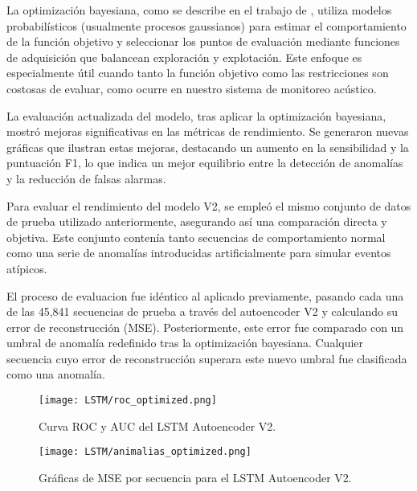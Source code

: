       La optimización bayesiana, como se describe en el trabajo de \citeauthor{gardner2014bayesian} \citeyear{gardner2014bayesian}, utiliza modelos probabilísticos (usualmente procesos gaussianos) para estimar el comportamiento de la función objetivo y seleccionar los puntos de evaluación mediante funciones de adquisición que balancean exploración y explotación. Este enfoque es especialmente útil cuando tanto la función objetivo como las restricciones son costosas de evaluar, como ocurre en nuestro sistema de monitoreo acústico.

      La evaluación actualizada del modelo, tras aplicar la optimización bayesiana, mostró mejoras significativas en las métricas de rendimiento. Se generaron nuevas gráficas que ilustran estas mejoras, destacando un aumento en la sensibilidad y la puntuación F1, lo que indica un mejor equilibrio entre la detección de anomalías y la reducción de falsas alarmas.



      Para evaluar el rendimiento del modelo  V2, se empleó el mismo conjunto de datos de prueba utilizado anteriormente, asegurando así una comparación directa y objetiva. Este conjunto contenía tanto secuencias de comportamiento normal como una serie de anomalías introducidas artificialmente para simular eventos atípicos.

      El proceso de evaluacion fue idéntico al aplicado previamente, pasando cada una de las 45,841 secuencias de prueba a través del autoencoder V2 y calculando su error de reconstrucción (MSE). Posteriormente, este error fue comparado con un umbral de anomalía redefinido tras la optimización bayesiana. Cualquier secuencia cuyo error de reconstrucción superara este nuevo umbral fue clasificada como una anomalía.

      \begin{figure}[ht!]
            \centering
            \texttt{[image: LSTM/roc\_optimized.png]}
            \caption{Curva ROC y AUC del LSTM Autoencoder V2.}
            \label{fig:roc_lstm_optimized}
      \end{figure}

      \begin{figure}[ht!]
            \centering
            \texttt{[image: LSTM/animalias\_optimized.png]}
            \caption{Gráficas de MSE por secuencia para el LSTM Autoencoder V2.}
            \label{fig:mse_lstm_optimized}
      \end{figure}


